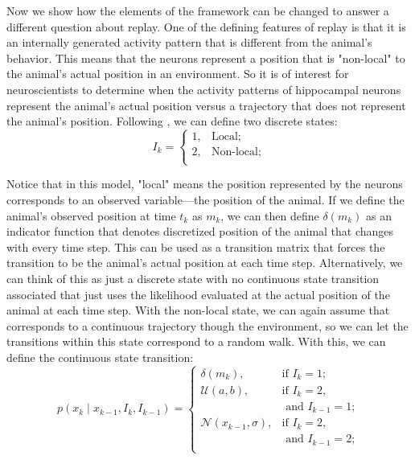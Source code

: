 \documentclass[conference]{IEEEtran}
\begin{document}
Now we show how the elements of the framework can be changed to answer a different question about replay. One of the defining features of replay is that it is an internally generated activity pattern that is different from the animal's behavior. This means that the neurons represent a position that is "non-local" to the animal's actual position in an environment. So it is of interest for neuroscientists to determine when the activity patterns of hippocampal neurons represent the animal's actual position versus a trajectory that does not represent the animal's position. Following \cite{EdenCharacterizingComplexMultiScale2018}, we can define two discrete states:
\begin{equation}
    I_{k} = \begin{cases}
        1, & \text{Local;}\\
        2, & \text{Non-local;}\\
         \end{cases}
\end{equation}

Notice that in this model, "local" means the position represented by the neurons corresponds to an observed variable---the position of the animal. If we define the animal's observed position at time $t_{k}$ as $m_{k}$, we can then define $\delta (m_{k})$ as an indicator function that denotes discretized position of the animal that changes with every time step. This can be used as a transition matrix that forces the transition to be the animal's actual position at each time step. Alternatively, we can think of this as just a discrete state with no continuous state transition associated that just uses the likelihood evaluated at the actual position of the animal at each time step. With the non-local state, we can again assume that corresponds to a continuous trajectory though the environment, so we can let the transitions within this state correspond to a random walk. With this, we can define the continuous state transition:
\begin{equation}
    p(x_{k} \mid x_{k-1}, I_{k}, I_{k-1}) = \begin{cases}
        \delta (m_{k}), & \text{if } I_{k}=1; \\
        \mathcal{U}(a, b), & \text{if } I_{k}=2, \\
        & \text{ and } I_{k-1}=1; \\
        \mathcal{N}(x_{k-1}, \sigma), & \text{if } I_{k}=2, \\
        & \text{ and } I_{k-1}=2;\\
        
    \end{cases}        
\end{equation}
\end{document}
